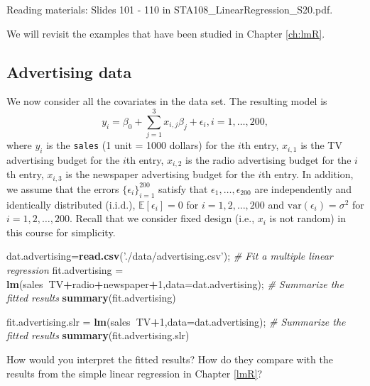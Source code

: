 \documentclass[12pt,]{book}
\newenvironment{Shaded}{\begin{snugshade}}{\end{snugshade}}
\newcommand{\KeywordTok}[1]{\textcolor[rgb]{0.13,0.29,0.53}{\textbf{#1}}}
\newcommand{\DataTypeTok}[1]{\textcolor[rgb]{0.13,0.29,0.53}{#1}}
\newcommand{\DecValTok}[1]{\textcolor[rgb]{0.00,0.00,0.81}{#1}}
\newcommand{\StringTok}[1]{\textcolor[rgb]{0.31,0.60,0.02}{#1}}
\newcommand{\CommentTok}[1]{\textcolor[rgb]{0.56,0.35,0.01}{\textit{#1}}}
\newcommand{\OperatorTok}[1]{\textcolor[rgb]{0.81,0.36,0.00}{\textbf{#1}}}
\newcommand{\NormalTok}[1]{#1}
\begin{document}
Reading materials: Slides 101 - 110 in
STA108\_LinearRegression\_S20.pdf.

We will revisit the examples that have been studied in Chapter
\ref{ch:lmR}.

\subsection{Advertising data}\label{advertising-data-1}

We now consider all the covariates in the data set. The resulting model
is \[
    y_i =  \beta_0 + \sum_{j=1}^3 x_{i,j} \beta_j  +  \epsilon_i, i=1,\ldots, 200,
    \] where \(y_i\) is the \texttt{sales} (1 unit = 1000 dollars) for
the \(i\)th entry, \(x_{i,1}\) is the TV advertising budget for the
\(i\)th entry, \(x_{i,2}\) is the radio advertising budget for the
\(i\)th entry, \(x_{i,3}\) is the newspaper advertising budget for the
\(i\)th entry. In addition, we assume that the errors
\(\{\epsilon_i\}_{i=1}^{200}\) satisfy that
\(\epsilon_1,\ldots, \epsilon_200\) are independently and identically
distributed (i.i.d.), \(\mathbb{E}[\epsilon_i]= 0\) for
\(i=1,2,\ldots, 200\) and \(\mathrm{var}(\epsilon_i)=\sigma^2\) for
\(i=1,2,\ldots, 200\). Recall that we consider fixed design (i.e.,
\(x_i\) is not random) in this course for simplicity.

\begin{Shaded}
\begin{Highlighting}[]
\NormalTok{dat.advertising=}\KeywordTok{read.csv}\NormalTok{(}\StringTok{'./data/advertising.csv'}\NormalTok{);}
\CommentTok{# Fit a multiple linear regression}
\NormalTok{fit.advertising =}\StringTok{ }\KeywordTok{lm}\NormalTok{(sales}\OperatorTok{~}\NormalTok{TV}\OperatorTok{+}\NormalTok{radio}\OperatorTok{+}\NormalTok{newspaper}\OperatorTok{+}\DecValTok{1}\NormalTok{,}\DataTypeTok{data=}\NormalTok{dat.advertising); }
\CommentTok{# Summarize the fitted results}
\KeywordTok{summary}\NormalTok{(fit.advertising) }

\NormalTok{fit.advertising.slr =}\StringTok{ }\KeywordTok{lm}\NormalTok{(sales}\OperatorTok{~}\NormalTok{TV}\OperatorTok{+}\DecValTok{1}\NormalTok{,}\DataTypeTok{data=}\NormalTok{dat.advertising); }
\CommentTok{# Summarize the fitted results}
\KeywordTok{summary}\NormalTok{(fit.advertising.slr) }
\end{Highlighting}
\end{Shaded}

How would you interpret the fitted results? How do they compare with the
results from the simple linear regression in Chapter \ref{lmR}?
\end{document}
